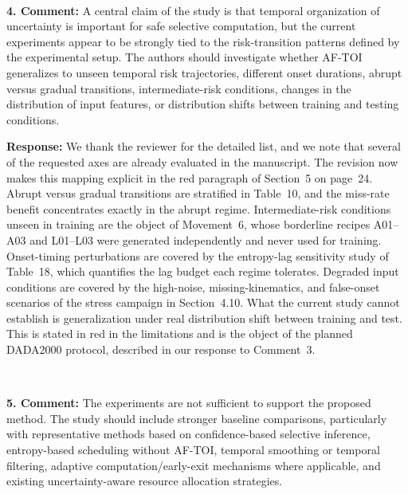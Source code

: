 \documentclass[1p,12pt,authoryear]{elsarticle}
\begin{document}
~

\noindent \textbf{4. Comment:} A central claim of the study is that temporal organization of uncertainty is important for safe selective computation, but the current experiments appear to be strongly tied to the risk-transition patterns defined by the experimental setup. The authors should investigate whether AF-TOI generalizes to unseen temporal risk trajectories, different onset durations, abrupt versus gradual transitions, intermediate-risk conditions, changes in the distribution of input features, or distribution shifts between training and testing conditions.

\vspace{2mm}
\noindent \textbf{Response:} We thank the reviewer for the detailed list, and we note that several of the requested axes are already evaluated in the manuscript. The revision now makes this mapping explicit in the red paragraph of Section~5 on page~24. Abrupt versus gradual transitions are stratified in Table~10, and the miss-rate benefit concentrates exactly in the abrupt regime. Intermediate-risk conditions unseen in training are the object of Movement~6, whose borderline recipes A01--A03 and L01--L03 were generated independently and never used for training. Onset-timing perturbations are covered by the entropy-lag sensitivity study of Table~18, which quantifies the lag budget each regime tolerates. Degraded input conditions are covered by the high-noise, missing-kinematics, and false-onset scenarios of the stress campaign in Section~4.10. What the current study cannot establish is generalization under real distribution shift between training and test. This is stated in red in the limitations and is the object of the planned DADA2000 protocol, described in our response to Comment~3.

~

\noindent \textbf{5. Comment:} The experiments are not sufficient to support the proposed method. The study should include stronger baseline comparisons, particularly with representative methods based on confidence-based selective inference, entropy-based scheduling without AF-TOI, temporal smoothing or temporal filtering, adaptive computation/early-exit mechanisms where applicable, and existing uncertainty-aware resource allocation strategies.
\end{document}
